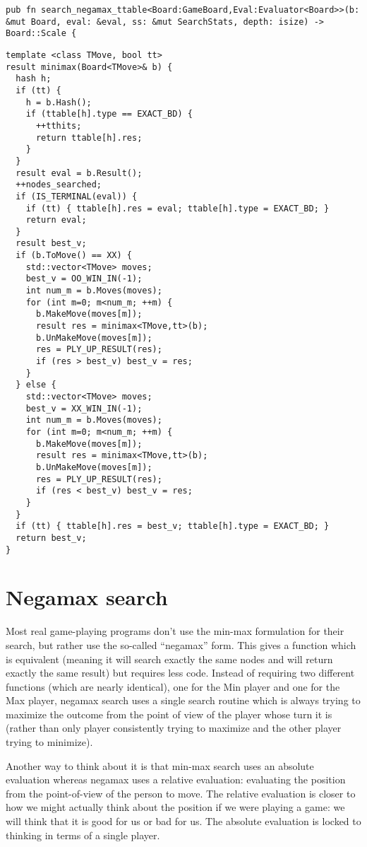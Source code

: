 \documentclass[10pt,dvipdfmx,letterpaper]{report}
\begin{document}
{\scriptsize
\begin{verbatim}
pub fn search_negamax_ttable<Board:GameBoard,Eval:Evaluator<Board>>(b: &mut Board, eval: &eval, ss: &mut SearchStats, depth: isize) -> Board::Scale {
\end{verbatim}
}

\begin{verbatim}
template <class TMove, bool tt>
result minimax(Board<TMove>& b) {
  hash h;
  if (tt) {
    h = b.Hash();
    if (ttable[h].type == EXACT_BD) {
      ++tthits;
      return ttable[h].res;
    }
  }
  result eval = b.Result();
  ++nodes_searched;
  if (IS_TERMINAL(eval)) {
    if (tt) { ttable[h].res = eval; ttable[h].type = EXACT_BD; }
    return eval;
  }
  result best_v;
  if (b.ToMove() == XX) {
    std::vector<TMove> moves;
    best_v = OO_WIN_IN(-1);
    int num_m = b.Moves(moves);
    for (int m=0; m<num_m; ++m) {
      b.MakeMove(moves[m]);
      result res = minimax<TMove,tt>(b);
      b.UnMakeMove(moves[m]);
      res = PLY_UP_RESULT(res);
      if (res > best_v) best_v = res;
    }
  } else {
    std::vector<TMove> moves;
    best_v = XX_WIN_IN(-1);
    int num_m = b.Moves(moves);
    for (int m=0; m<num_m; ++m) {
      b.MakeMove(moves[m]);
      result res = minimax<TMove,tt>(b);
      b.UnMakeMove(moves[m]);
      res = PLY_UP_RESULT(res);
      if (res < best_v) best_v = res;
    }
  }
  if (tt) { ttable[h].res = best_v; ttable[h].type = EXACT_BD; }
  return best_v;
}
\end{verbatim}

\section{Negamax search}


Most real game-playing programs don't use the min-max
formulation for their search, but rather use the so-called
``negamax'' form.  This gives a function which is equivalent
(meaning it will search exactly the same nodes and will
return exactly the same result) but requires less code.
Instead of requiring two different functions (which are nearly identical),
one for the Min player and one for the Max player, negamax search uses
a single search routine which is always trying to maximize the outcome from the
point of view of the player whose turn it is (rather than only player consistently
trying to maximize and the other player trying to minimize).

Another way to think about it is that min-max search uses an absolute
evaluation whereas negamax uses a relative evaluation: evaluating the position
from the point-of-view of the person to move.  The relative evaluation is closer
to how we might actually think about the position if we were playing a game: we
will think that it is good for us or bad for us.  The absolute evaluation is locked
to thinking in terms of a single player.
\end{document}
